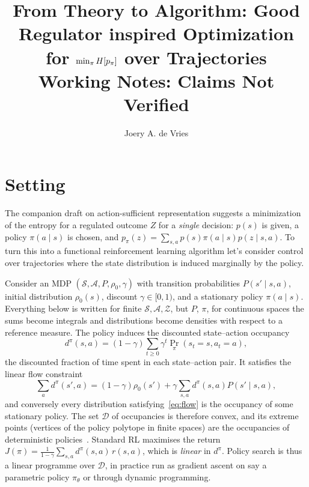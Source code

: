 \documentclass[11pt]{article}
\title{From Theory to Algorithm: Good Regulator inspired Optimization for $\min_\pi H\!\left[p_\pi\right]$ over Trajectories\\
\Large \textbf{Working Notes: Claims Not Verified}}
\author{Joery A. de Vries}
\theoremstyle{remark}
\newcommand{\Acal}{\mathcal A}
\newcommand{\Scal}{\mathcal S}
\newcommand{\Zcal}{\mathcal Z}
\newcommand{\Dcal}{\mathcal D}
\newcommand{\1}{\mathds{1}}
\newcommand{\occ}{d^{\pi}}
\newcommand{\pz}{p_{\pi}}
\begin{document}
\maketitle

\section{Setting}
\label{sec:setting}

The companion draft on action-sufficient representation suggests a minimization of the entropy for a regulated outcome $Z$ for a \emph{single} decision: $p(s)$ is given, a policy $\pi(a\mid s)$ is chosen, and $\pz(z)=\sum_{s,a}p(s)\pi(a\mid s)p(z\mid s,a)$.
To turn this into a functional reinforcement learning algorithm let's consider control over trajectories where the state distribution is induced marginally by the policy.

Consider an MDP $(\Scal,\Acal,P,\rho_0,\gamma)$ with transition probabilities $P(s'\mid s,a)$, initial distribution $\rho_0(s)$, discount $\gamma\in[0,1)$, and a stationary policy $\pi(a\mid s)$.
Everything below is written for finite $\Scal,\Acal,\Zcal$, but $P$, $\pi$, for continuous spaces the sums become integrals and distributions become densities with respect to a reference measure.
The policy induces the discounted state--action occupancy
\begin{equation}
  \occ(s,a)=(1-\gamma)\sum_{t\ge0}\gamma^t\Pr_\pi(s_t=s,a_t=a),
  \label{eq:occ}
\end{equation}
the discounted fraction of time spent in each state--action pair.
It satisfies the linear flow constraint
\begin{equation}
  \sum_a \occ(s',a)=(1-\gamma)\rho_0(s')+\gamma\sum_{s,a}\occ(s,a)P(s'\mid s,a),
  \label{eq:flow}
\end{equation}
and conversely every distribution satisfying~\eqref{eq:flow} is the occupancy of some stationary policy.
The set $\Dcal$ of occupancies is therefore convex, and its extreme points (vertices of the policy polytope in finite spaces) are the occupancies of deterministic policies~\citep{Puterman-markov94}.
Standard RL maximises the return $J(\pi)=\tfrac{1}{1-\gamma}\sum_{s,a}\occ(s,a)\,r(s,a)$, which is \emph{linear} in $\occ$.
Policy search is thus a linear programme over $\Dcal$, in practice run as gradient ascent on say a parametric policy $\pi_\theta$ or through dynamic programming.
\end{document}
